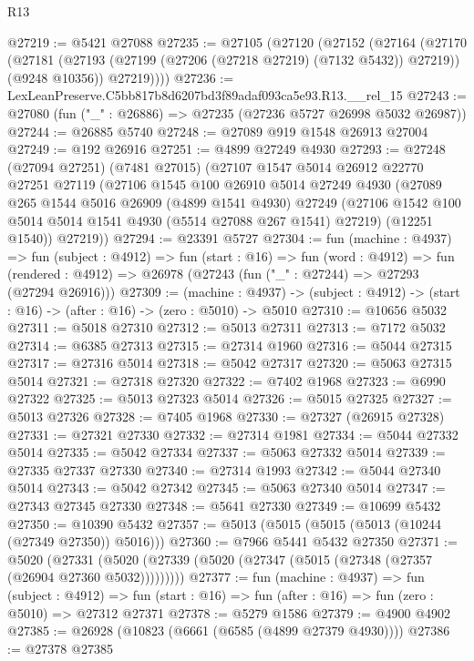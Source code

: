 \begin{lexlean}{R13}
\begin{coremodule}
@27219 := @5421 @27088
@27235 := @27105
    (@27120
      (@27152
        (@27164
          (@27170
            (@27181 (@27193 (@27199 (@27206 (@27218 @27219) (@7132 @5432)) @27219)) (@9248 @10356))
            @27219))))
@27236 := LexLeanPreserve.C5bb817b8d6207bd3f89adaf093ca5e93.R13.__rel_15
@27243 := @27080 (fun ("_" : @26886) => @27235 (@27236 @5727 @26998 @5032 @26987))
@27244 := @26885 @5740
@27248 := @27089 @919 @1548 @26913 @27004
@27249 := @192 @26916
@27251 := @4899 @27249 @4930
@27293 := @27248
    (@27094 @27251)
    (@7481 @27015)
    (@27107
      @1547
      @5014
      @26912
      @22770
      @27251
      @27119
      (@27106
        @1545
        @100
        @26910
        @5014
        @27249
        @4930
        (@27089
          @265
          @1544
          @5016
          @26909
          (@4899 @1541 @4930)
          @27249
          (@27106 @1542 @100 @5014 @5014 @1541 @4930 (@5514 @27088 @267 @1541) @27219)
          (@12251 @1540))
        @27219))
@27294 := @23391 @5727
@27304 := fun (machine : @4937) =>
  fun (subject : @4912) =>
  fun (start : @16) =>
  fun (word : @4912) =>
  fun (rendered : @4912) => @26978 (@27243 (fun ("_" : @27244) => @27293 (@27294 @26916)))
@27309 := (machine : @4937) ->
  (subject : @4912) -> (start : @16) -> (after : @16) -> (zero : @5010) -> @5010
@27310 := @10656 @5032
@27311 := @5018 @27310
@27312 := @5013 @27311
@27313 := @7172 @5032
@27314 := @6385 @27313
@27315 := @27314 @1960
@27316 := @5044 @27315
@27317 := @27316 @5014
@27318 := @5042 @27317
@27320 := @5063 @27315 @5014
@27321 := @27318 @27320
@27322 := @7402 @1968
@27323 := @6990 @27322
@27325 := @5013 @27323 @5014
@27326 := @5015 @27325
@27327 := @5013 @27326
@27328 := @7405 @1968
@27330 := @27327 (@26915 @27328)
@27331 := @27321 @27330
@27332 := @27314 @1981
@27334 := @5044 @27332 @5014
@27335 := @5042 @27334
@27337 := @5063 @27332 @5014
@27339 := @27335 @27337 @27330
@27340 := @27314 @1993
@27342 := @5044 @27340 @5014
@27343 := @5042 @27342
@27345 := @5063 @27340 @5014
@27347 := @27343 @27345 @27330
@27348 := @5641 @27330
@27349 := @10699 @5432
@27350 := @10390 @5432
@27357 := @5013 (@5015 (@5015 (@5013 (@10244 (@27349 @27350)) @5016)))
@27360 := @7966 @5441 @5432 @27350
@27371 := @5020
    (@27331 (@5020 (@27339 (@5020 (@27347 (@5015 (@27348 (@27357 (@26904 @27360 @5032)))))))))
@27377 := fun (machine : @4937) =>
  fun (subject : @4912) =>
  fun (start : @16) => fun (after : @16) => fun (zero : @5010) => @27312 @27371
@27378 := @5279 @1586
@27379 := @4900 @4902
@27385 := @26928 (@10823 (@6661 (@6585 (@4899 @27379 @4930))))
@27386 := @27378 @27385

\end{coremodule}
\end{lexlean}
